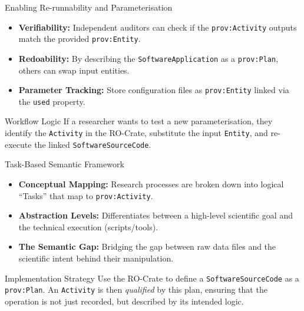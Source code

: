 \documentclass[aspectratio=169]{beamer}
\begin{document}
\begin{frame}{Enabling Re-runnability and Parameterisation}
    \begin{itemize}
        \item \textbf{Verifiability:} Independent auditors can check if the \texttt{prov:Activity} outputs match the provided \texttt{prov:Entity}.
        \item \textbf{Redoability:} By describing the \texttt{SoftwareApplication} as a \texttt{prov:Plan}, others can swap input entities.
        \item \textbf{Parameter Tracking:} Store configuration files as \texttt{prov:Entity} linked via the \texttt{used} property.
    \end{itemize}
    \begin{exampleblock}{Workflow Logic}
        If a researcher wants to test a new parameterisation, they identify the \texttt{Activity} in the RO-Crate, substitute the input \texttt{Entity}, and re-execute the linked \texttt{SoftwareSourceCode}.
    \end{exampleblock}
\end{frame}

\begin{frame}{Task-Based Semantic Framework}
    \begin{itemize}
        \item \textbf{Conceptual Mapping:} Research processes are broken down into logical \enquote{Tasks} that map to \texttt{prov:Activity}.
        \item \textbf{Abstraction Levels:} Differentiates between a high-level scientific goal and the technical execution (scripts/tools).
        \item \textbf{The Semantic Gap:} Bridging the gap between raw data files and the scientific intent behind their manipulation.
    \end{itemize}
    \vspace{0.2cm}
    \begin{block}{Implementation Strategy}
        Use the RO-Crate to define a \texttt{SoftwareSourceCode} as a \texttt{prov:Plan}. An \texttt{Activity} is then \textit{qualified} by this plan, ensuring that the operation is not just recorded, but described by its intended logic.
    \end{block}
\end{frame}
\end{document}
